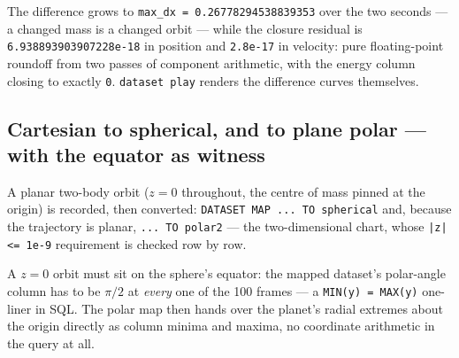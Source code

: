 \documentclass[11pt]{article}
\newcommand{\code}[1]{\texttt{#1}}
\begin{document}
The difference grows to \code{max\_dx = 0.26778294538839353} over the
two seconds --- a
changed mass is a changed orbit --- while the closure residual is
\code{6.938893903907228e-18} in position and \code{2.8e-17} in
velocity: pure floating-point roundoff from two passes of component
arithmetic, with the energy column closing to exactly \code{0}.
\code{dataset play} renders the difference curves themselves.

\subsection{Cartesian to spherical, and to plane polar --- with the equator as witness}

A planar two-body orbit ($z = 0$ throughout, the centre of mass
pinned at the origin) is recorded, then converted: \code{DATASET MAP
... TO spherical} and, because the trajectory is planar, \code{... TO
polar2} --- the two-dimensional chart, whose \code{|z| <= 1e-9}
requirement is checked row by row.

A $z = 0$ orbit must sit on the sphere's equator: the mapped
dataset's polar-angle column has to be $\pi/2$ at \emph{every} one of
the 100 frames --- a \code{MIN(y) = MAX(y)} one-liner in SQL. The
polar map then hands over the planet's radial extremes about the
origin directly as column minima and maxima, no coordinate arithmetic
in the query at all.
\end{document}
